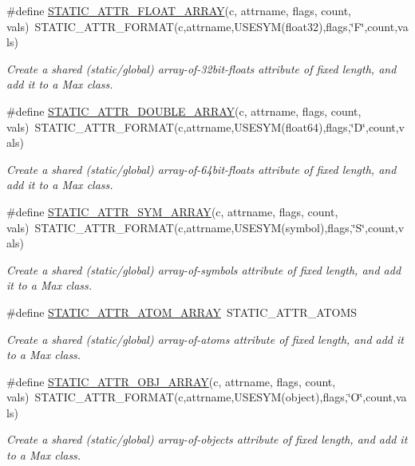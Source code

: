 \begin{DoxyCompactItemize}
\#define \hyperlink{group__attr_ga1afb57bc57076c4ec1ee127bbe100740}{STATIC\_\-ATTR\_\-FLOAT\_\-ARRAY}(c, attrname, flags, count, vals)~STATIC\_\-ATTR\_\-FORMAT(c,attrname,USESYM(float32),flags,\char`\"{}F\char`\"{},count,vals)
\begin{DoxyCompactList}\small\item\em Create a shared (static/global) array-\/of-\/32bit-\/floats attribute of fixed length, and add it to a Max class. \item\end{DoxyCompactList}\item 
\#define \hyperlink{group__attr_ga7b71a8972ec7cfd9129f5093660e2d06}{STATIC\_\-ATTR\_\-DOUBLE\_\-ARRAY}(c, attrname, flags, count, vals)~STATIC\_\-ATTR\_\-FORMAT(c,attrname,USESYM(float64),flags,\char`\"{}D\char`\"{},count,vals)
\begin{DoxyCompactList}\small\item\em Create a shared (static/global) array-\/of-\/64bit-\/floats attribute of fixed length, and add it to a Max class. \item\end{DoxyCompactList}\item 
\#define \hyperlink{group__attr_ga2e42ccd99f08c560894542e53b29e313}{STATIC\_\-ATTR\_\-SYM\_\-ARRAY}(c, attrname, flags, count, vals)~STATIC\_\-ATTR\_\-FORMAT(c,attrname,USESYM(symbol),flags,\char`\"{}S\char`\"{},count,vals)
\begin{DoxyCompactList}\small\item\em Create a shared (static/global) array-\/of-\/symbols attribute of fixed length, and add it to a Max class. \item\end{DoxyCompactList}\item 
\#define \hyperlink{group__attr_ga04a253a4e0c92cd4fdc36e5f73478532}{STATIC\_\-ATTR\_\-ATOM\_\-ARRAY}~STATIC\_\-ATTR\_\-ATOMS
\begin{DoxyCompactList}\small\item\em Create a shared (static/global) array-\/of-\/atoms attribute of fixed length, and add it to a Max class. \item\end{DoxyCompactList}\item 
\#define \hyperlink{group__attr_ga93ab45fd95fa4111393a7c68ff7492c8}{STATIC\_\-ATTR\_\-OBJ\_\-ARRAY}(c, attrname, flags, count, vals)~STATIC\_\-ATTR\_\-FORMAT(c,attrname,USESYM(object),flags,\char`\"{}O\char`\"{},count,vals)
\begin{DoxyCompactList}\small\item\em Create a shared (static/global) array-\/of-\/objects attribute of fixed length, and add it to a Max class. \item\end{DoxyCompactList}\item 

\end{DoxyCompactItemize}

